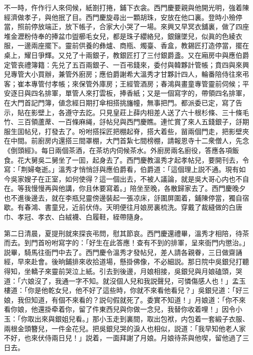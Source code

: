 不一時，仵作行人來伺候，紙劄打捲，鋪下衣衾。西門慶要親與他開光明，強着陳經濟做孝子，與他抿了目。西門慶旋尋出一顆胡珠，安放在他口裏。登時小殮停當，照前停放端正，放下帳子，合家大小哭了一場。來興又早冥衣舖裏，做了四座堆金瀝粉侍奉的捧盆巾盥櫛毛女兒，都是珠子纓絡兒，銀鑲墜兒，似眞的色綾衣服，一邊兩座擺下。靈前供養的彝爐、商瓶、燭臺、香盒，教錫匠打造停當，擺在桌上，耀日爭輝。又兑了十兩銀子，教銀匠打了三付銀爵盞。又在廂房中與應伯爵定管丧禮簿籍：先兑了五百兩銀子、一百弔錢來，委付與韓夥計管帳；賁四與來興兒專管大小買辦，兼管外廚房；應伯爵謝希大溫秀才甘夥計四人，輪番陪侍往來弔客；崔本專管付孝帳；來保管外庫房；王經管酒房；春鴻與畫童專管靈前伺候；平安逐日與四名排軍，單管人來打雲板，捧香紙；又是一個寫字的，帶領四名排軍，在大門首記門簿，値念經日期打傘相搭挑旛幢，無事把門。都派委已定，寫了告示，貼在影壁上，各遵守去訖。只見皇莊上薛内相差人送了六十根杉條、三十條毛竹、三百領蘆蓆、一百條麻䋲，㧱帖兒與西門慶瞧。連忙賞了來人五錢銀子，㧱期服生囬帖兒，打發去了。吩咐搭採匠把棚起脊，搭大着些，㽞兩個門走，把影壁夾在中間。前廚房内還搭三間罩棚，大門首紮七間榜棚，請報恩寺十二衆僧人，先念《倒頭經》。每日兩個茶酒，在茶坊内伺候茶水。外廚房兩名廚役，答應各項飯食。花大舅吳二舅坐了一囬，起身去了。西門慶教溫秀才起孝帖兒，要開刊去，令寫：「荆婦奄逝。」溫秀才悄悄㧱與應伯爵看，伯爵道：「這個理上説不通。現有如今吳家嫂子在正室，如何使得？這一個出去，不被人議論，就是吳大哥心内也不自在。等我慢慢再與他講，你且休要寫着。」陪坐至晚，各散歸家去了。西門慶晚夕也不進後邊去，就在李瓶兒靈傍邊裝起一張凉床，㧱圍屏圍着，鋪陳停當，獨自宿歇。有春鴻、書童兒，近前伏侍。天明便往月娘房裏梳洗。穿戴了裁縫做的白唐巾、孝冠、孝衣、白絨襪、白履鞋，絰帶隨身。

第二日清晨，夏提刑就來探丧弔問，慰其節哀。西門慶還禮畢，溫秀才相陪，待茶而去。到門首吩咐寫字的：「好生在此答應！查有不到的排軍，呈來衙門内懲治。」説畢，騎馬往衙門中去了。西門慶令溫秀才發帖兒，差人請各親眷，三日做齋誦經，早來赴會。後晌鋪排來收拾道場，懸掛佛像，不必細説。那日院中吳銀兒打聽得知，坐轎子來靈前哭泣上紙。引去到後邊，月娘相接，吳銀兒與月娘磕頭，哭道：「六娘沒了，我通一字不知。就沒個人兒和我説聲兒，可憐傷感人也！」孟玉樓道：「你是他乾女兒，他不好了這些時，你就不來看他看兒？」吳銀兒道：「好三娘，我但知道，有個不來看的？説句假就死了。委實不知道！」月娘道：「你不來看你娘，他還掛牵着你，留了件東西兒與你做一念兒，我替你收着哩！」因令小玉：「你取出來與銀姐兒看。」那小玉走到裏間，取出包袱，内包着一套緞子衣服、兩根金頭簪兒，一件金花兒。把吳銀兒哭的淚人也相似，説道：「我早知他老人家不好，也來伏侍兩日兒！」説着，一面拜謝了月娘。月娘待茶與他喫，留他過了三日去。

